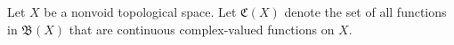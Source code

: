 Let $X$ be a nonvoid topological space. Let $\mathfrak{C}(X)$ denote the set of all functions in $\mathfrak{B}(X)$ that are continuous complex-valued functions on $X$.